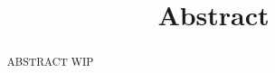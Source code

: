 \documentclass[../UsabilityReport.tex]{subfiles}
\begin{document}
\title{Abstract}
\begin{abstract}
	ABSTRACT WIP
\end{abstract}

\thispagestyle{fancy}
	\newpage
		
\end{document}
